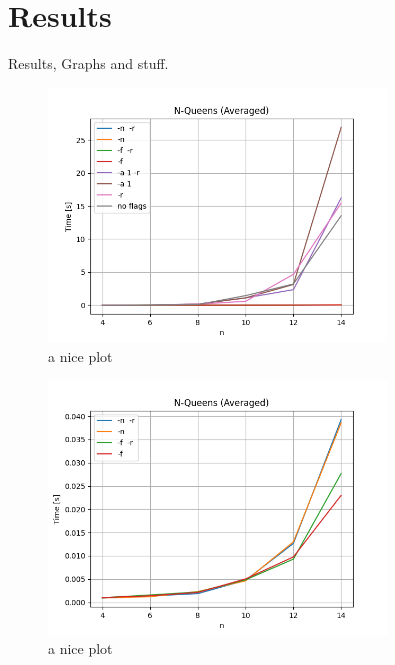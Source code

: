 
\chapter{Results}

Results, Graphs and stuff.

\begin{figure}[ht]
	\centering
	\includegraphics[width=0.8\textwidth]{./Problems/queens/plots/time.png}
	\caption{a nice plot}
	\label{fig:queens:time}
\end{figure}


\begin{figure}[ht]
	\centering
	\includegraphics[width=0.8\textwidth]{./Problems/queens/plots/time_no_arc.png}
	\caption{a nice plot}
	\label{fig:queens:time_no_arc}
\end{figure}



